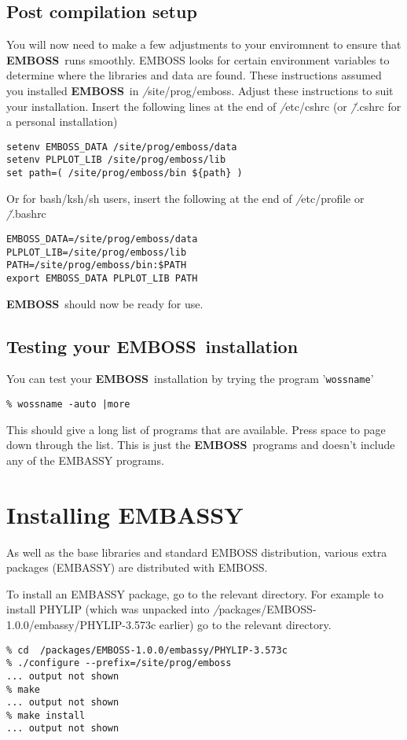 \documentclass{report}
\newcommand{\ilcomm}[1]{{\tt #1}}
\newcommand{\filename}[1]{{\sf\textsl #1}}
\newcommand{\EMBOSS}{{\sf\bfseries EMBOSS}}
\begin{document}
\subsection{Post compilation setup}

You will now need to make a few adjustments to your enviromnent to ensure that \EMBOSS\ runs smoothly.
EMBOSS looks for certain environment variables to determine where the libraries and data are found. These instructions assumed you installed \EMBOSS\ in \filename{/site/prog/emboss}. Adjust these instructions to suit your installation.
Insert the following lines at the end of \filename{/etc/cshrc} (or \filename{\~/.cshrc} for a personal installation)
\begin{verbatim}
setenv EMBOSS_DATA /site/prog/emboss/data
setenv PLPLOT_LIB /site/prog/emboss/lib
set path=( /site/prog/emboss/bin ${path} )
\end{verbatim}
Or for bash/ksh/sh users, insert the following at the end of \filename{/etc/profile} or \filename{\~/.bashrc}
\begin{verbatim}
EMBOSS_DATA=/site/prog/emboss/data
PLPLOT_LIB=/site/prog/emboss/lib
PATH=/site/prog/emboss/bin:$PATH
export EMBOSS_DATA PLPLOT_LIB PATH
\end{verbatim}

\EMBOSS\ should now be ready for use.

\subsection{Testing your \EMBOSS\ installation}

You can test your \EMBOSS\ installation by trying the program '\ilcomm{wossname}'
\begin{verbatim}
% wossname -auto |more
\end{verbatim}
This should give a long list of programs that are available. Press space to page down through the list. This is just the \EMBOSS\ programs and doesn't include any of the EMBASSY programs.

\section{Installing EMBASSY}

As well as the base libraries and standard EMBOSS distribution, various extra packages (EMBASSY) are distributed with EMBOSS.

To install an EMBASSY package, go to the relevant directory. For example to install PHYLIP (which was unpacked into \filename{/packages/EMBOSS-1.0.0/embassy/PHYLIP-3.573c} earlier) go to the relevant directory.
\begin{verbatim}
% cd  /packages/EMBOSS-1.0.0/embassy/PHYLIP-3.573c
% ./configure --prefix=/site/prog/emboss
... output not shown
% make
... output not shown
% make install
... output not shown
\end{verbatim}
\end{document}
